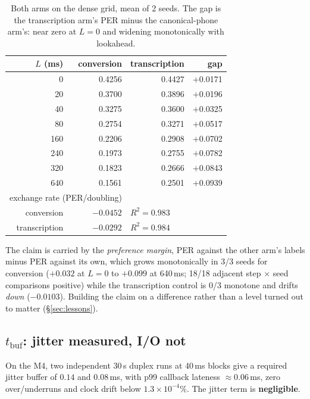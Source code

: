 \documentclass[9pt,a4paper,twocolumn]{article}
\newcommand{\tbuf}{\ensuremath{t_{\mathrm{buf}}}}
\begin{document}
\begin{table}[t]
\centering\small
\caption{Both arms on the dense grid, mean of 2 seeds. The gap is the
transcription arm's PER minus the canonical-phone arm's: near zero at $L{=}0$ and
widening monotonically with lookahead.}
\label{tab:h3dense}
\begin{tabular}{rrrr}
\toprule
$L$ (ms) & conversion & transcription & gap \\
\midrule
0   & 0.4256 & 0.4427 & $+$0.0171 \\
20  & 0.3700 & 0.3896 & $+$0.0196 \\
40  & 0.3275 & 0.3600 & $+$0.0325 \\
80  & 0.2754 & 0.3271 & $+$0.0517 \\
160 & 0.2206 & 0.2908 & $+$0.0702 \\
240 & 0.1973 & 0.2755 & $+$0.0782 \\
320 & 0.1823 & 0.2666 & $+$0.0843 \\
640 & 0.1561 & 0.2501 & $+$0.0939 \\
\midrule
\multicolumn{2}{l}{exchange rate (PER/doubling)} & & \\
\multicolumn{1}{r}{conversion} & $-0.0452$ & \multicolumn{2}{l}{$R^2=0.983$} \\
\multicolumn{1}{r}{transcription} & $-0.0292$ & \multicolumn{2}{l}{$R^2=0.984$} \\
\bottomrule
\end{tabular}
\end{table}

The claim is carried by the \emph{preference margin}, PER against the other
arm's labels minus PER against its own, which grows monotonically in 3/3
seeds for conversion ($+0.032$ at $L{=}0$ to $+0.099$ at 640\,ms; 18/18
adjacent step $\times$ seed comparisons positive) while the transcription
control is 0/3 monotone and drifts \emph{down} ($-0.0103$). Building the claim
on a difference rather than a level turned out to matter
(\S\ref{sec:lessons}).

\subsection{\tbuf{}: jitter measured, I/O not}
\label{sec:tbuf}

On the M4, two independent 30\,s duplex runs at 40\,ms blocks give a required
jitter buffer of $0.14$ and $0.08$\,ms, with p99 callback lateness
${\approx}0.06$\,ms, zero over/underruns and clock drift below
$1.3\times10^{-4}$\%. The jitter term is \textbf{negligible}.
\end{document}
